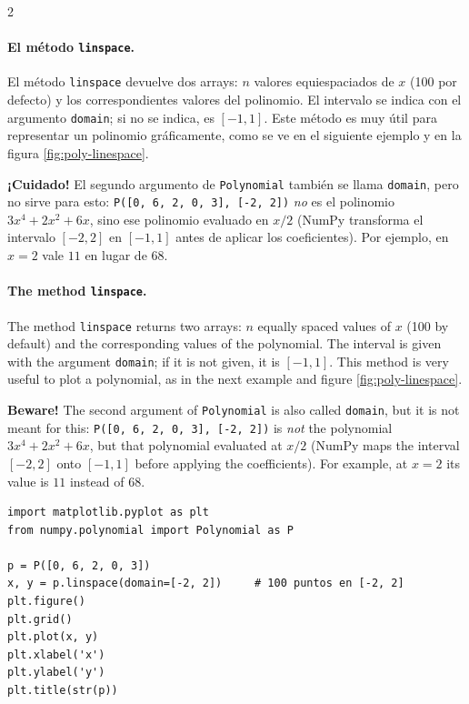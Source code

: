 \begin{paracol}{2}
\paragraph{El método \texttt{linspace}.}
El método \texttt{linspace} devuelve dos arrays: $n$ valores equiespaciados de $x$ (100 por defecto) y los correspondientes valores del polinomio. El intervalo se indica con el argumento \texttt{domain}; si no se indica, es $[-1,1]$. Este método es muy útil para representar un polinomio gráficamente, como se ve en el siguiente ejemplo y en la figura \ref{fig:poly-linespace}.

\textbf{¡Cuidado!} El segundo argumento de \texttt{Polynomial} también se llama \texttt{domain}, pero no sirve para esto: \texttt{P([0, 6, 2, 0, 3], [-2, 2])} \emph{no} es el polinomio $3x^4+2x^2+6x$, sino ese polinomio evaluado en $x/2$ (NumPy transforma el intervalo $[-2,2]$ en $[-1,1]$ antes de aplicar los coeficientes). Por ejemplo, en $x=2$ vale $11$ en lugar de $68$.

\switchcolumn

\paragraph{The method \texttt{linspace}.}
The method \texttt{linspace} returns two arrays: $n$ equally spaced values of $x$ (100 by default) and the corresponding values of the polynomial. The interval is given with the argument \texttt{domain}; if it is not given, it is $[-1,1]$. This method is very useful to plot a polynomial, as in the next example and figure \ref{fig:poly-linespace}.

\textbf{Beware!} The second argument of \texttt{Polynomial} is also called \texttt{domain}, but it is not meant for this: \texttt{P([0, 6, 2, 0, 3], [-2, 2])} is \emph{not} the polynomial $3x^4+2x^2+6x$, but that polynomial evaluated at $x/2$ (NumPy maps the interval $[-2,2]$ onto $[-1,1]$ before applying the coefficients). For example, at $x=2$ its value is $11$ instead of $68$.

\end{paracol}

\begin{verbatim}
import matplotlib.pyplot as plt
from numpy.polynomial import Polynomial as P

p = P([0, 6, 2, 0, 3])
x, y = p.linspace(domain=[-2, 2])     # 100 puntos en [-2, 2]
plt.figure()
plt.grid()
plt.plot(x, y)
plt.xlabel('x')
plt.ylabel('y')
plt.title(str(p))
\end{verbatim}

